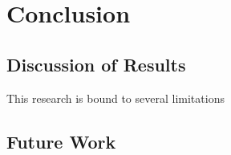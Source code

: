 \chapter{Conclusion}
\section{Discussion of Results}
This research is bound to several limitations
\section{Future Work}
\begin{comment}
- zusammenführen der artefakte in RAPADO
- recursive snarks -->auf den ersten Teil der EInleitung beziehen mit so vielen dokumenten zum verifizieren gleichzeitig usw.
\end{comment}
